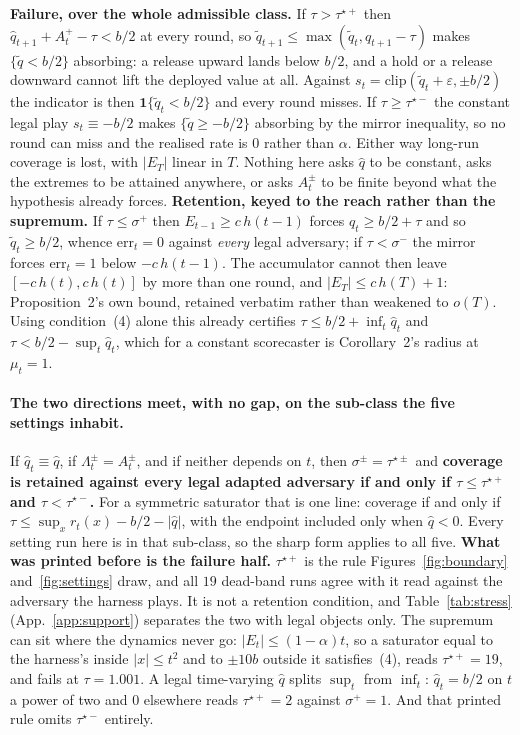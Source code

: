 \textbf{Failure, over the whole admissible class.} If $\tau > \tau^{\star+}$ then $\hat{q}_{t+1} +
A^{+}_t - \tau < b/2$ at every round, so $\tilde{q}_{t+1} \le \max(\tilde{q}_t, q_{t+1}-\tau)$
makes $\{\tilde{q} < b/2\}$ absorbing: a release upward lands below $b/2$, and a hold or a
release downward cannot lift the deployed value at all. Against $s_t =
\mathrm{clip}(\tilde{q}_t+\varepsilon,\pm b/2)$ the indicator is then $\mathbf{1}\{\tilde{q}_t <
b/2\}$ and every round misses. If $\tau \ge \tau^{\star-}$ the constant legal play $s_t \equiv
-b/2$ makes $\{\tilde{q} \ge -b/2\}$ absorbing by the mirror inequality, so no round can miss and
the realised rate is $0$ rather than $\alpha$.
Either way long-run coverage is lost, with $|E_T|$ linear in $T$. Nothing
here asks $\hat{q}$ to be constant, asks the extremes to be attained anywhere, or asks $A^{\pm}_t$
to be finite beyond what the hypothesis already forces. \textbf{Retention, keyed to the reach
rather than the supremum.} If $\tau \le \sigma^{+}$ then $E_{t-1} \ge c\,h(t-1)$ forces $q_t \ge
b/2+\tau$ and so $\tilde{q}_t \ge b/2$, whence $\mathrm{err}_t = 0$ against \emph{every} legal
adversary; if $\tau < \sigma^{-}$ the mirror forces $\mathrm{err}_t = 1$ below $-c\,h(t-1)$. The
accumulator cannot then leave $[-c\,h(t),c\,h(t)]$ by more than one round, and $|E_T| \le
c\,h(T)+1$: Proposition~2's own bound, retained verbatim rather than weakened to $o(T)$. Using
condition~(4) alone this already certifies $\tau \le b/2+\inf_t\hat{q}_t$ and $\tau < b/2 -
\sup_t\hat{q}_t$, which for a constant scorecaster is Corollary~2's radius at $\mu_t = 1$.

\paragraph{The two directions meet, with no gap, on the sub-class the five settings inhabit.} If
$\hat{q}_t \equiv \hat{q}$, if $\Lambda^{\pm}_t = A^{\pm}_t$, and if neither depends on $t$, then
$\sigma^{\pm} = \tau^{\star\pm}$ and \textbf{coverage is retained against every legal adapted
adversary if and only if $\tau \le \tau^{\star+}$ and $\tau < \tau^{\star-}$.} For a symmetric
saturator that is one line: coverage if and only if $\tau \le \sup_x r_t(x) - b/2 - |\hat{q}|$,
with the endpoint included only when $\hat{q} < 0$. Every setting run here is in that sub-class,
so the sharp form applies to all five. \textbf{What was printed before is the failure half.}
$\tau^{\star+}$ is the rule Figures~\ref{fig:boundary} and~\ref{fig:settings} draw, and all $19$
dead-band runs agree with it read against the adversary the harness plays. It is not a retention
condition, and Table~\ref{tab:stress} (App.~\ref{app:support}) separates the two with legal
objects only. The supremum can
sit where the dynamics never go: $|E_t| \le (1-\alpha)t$, so a saturator equal to the harness's
inside $|x| \le t^2$ and to $\pm 10b$ outside it satisfies~(4), reads $\tau^{\star+} = 19$, and
fails at $\tau = 1.001$. A legal time-varying $\hat{q}$ splits $\sup_t$ from $\inf_t$: $\hat{q}_t =
b/2$ on $t$ a power of two and $0$ elsewhere reads $\tau^{\star+} = 2$ against $\sigma^{+} = 1$.
And that printed rule omits $\tau^{\star-}$ entirely.

